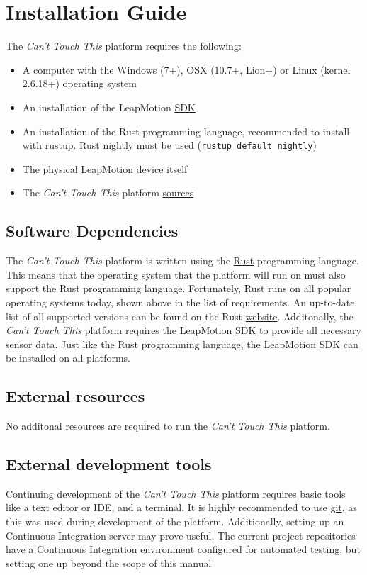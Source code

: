 \documentclass{standalone}
\begin{document}
  \section{Installation Guide}
  The \textit{Can't Touch This} platform requires the following:
  \begin{itemize}
    \tightlist{}
    \item A computer with the Windows (7+), OSX (10.7+, Lion+) or
      Linux (kernel 2.6.18+) operating system
    \item An installation of the LeapMotion
      \href{https://developer.leapmotion.com/sdk/v2}{SDK}
    \item An installation of the Rust programming language, recommended to
      install with \href{https://rustup.rs}{rustup}. Rust nightly must be used
      (\verb_rustup default nightly_)
    \item The physical LeapMotion device itself
    \item The \textit{Can't Touch This} platform
      \href{https://gitlab.com/timvisee/cant-touch-this.git}{sources}
  \end{itemize}

  \subsection{Software Dependencies}
  The \textit{Can't Touch This} platform is written using the
  \href{https://rust-lang.org}{Rust} programming language. This means that the
  operating system that the platform will run on must also support the Rust
  programming language. Fortunately, Rust runs on all popular operating systems
  today, shown above in the list of requirements. An up-to-date list of all
  supported versions can be found on the Rust
  \href{https://forge.rust-lang.org/platform-support.html}{website}.
  Additonally, the \textit{Can't Touch This} platform requires the LeapMotion
  \href{https://developer.leapmotion.com/sdk/v2}{SDK} to provide all necessary
  sensor data. Just like the Rust programming language, the LeapMotion SDK can
  be installed on all platforms.

  \subsection{External resources}
  No additonal resources are required to run the \textit{Can't Touch This}
  platform.

  \subsection{External development tools}
  Continuing development of the \textit{Can't Touch This} platform requires
  basic tools like a text editor or IDE, and a terminal. It is highly
  recommended to use \href{https://git-scm.com/}{git}, as this was used during
  development of the platform. Additionally, setting up an Continuous Integration server may prove
  useful. The current project repositories have a Continuous Integration
  environment configured for automated testing, but setting one up beyond the
  scope of this manual 

  \clearpage
\end{document}
